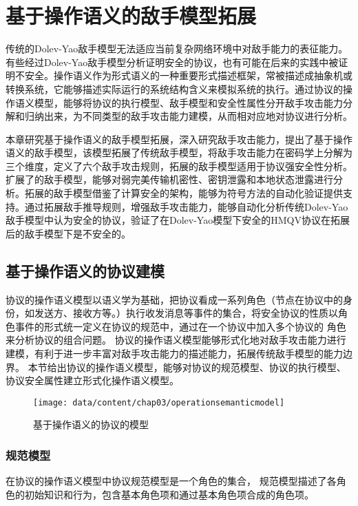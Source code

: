 ﻿%

\chapter{基于操作语义的敌手模型拓展}
\label{adversary}
传统的Dolev-Yao敌手模型无法适应当前复杂网络环境中对敌手能力的表征能力。有些经过Dolev-Yao敌手模型分析证明安全的协议，也有可能在后来的实践中被证明不安全。操作语义作为形式语义的一种重要形式描述框架，常被描述成抽象机或转换系统，它能够描述实际运行的系统结构含义来模拟系统的执行。通过协议的操作语义模型，能够将协议的执行模型、敌手模型和安全性属性分开敌手攻击能力分解和归纳出来，为不同类型的敌手攻击能力建模，从而相对应地对协议进行分析。

本章研究基于操作语义的敌手模型拓展，深入研究敌手攻击能力，提出了基于操作语义的敌手模型，该模型拓展了传统敌手模型，将敌手攻击能力在密码学上分解为三个维度，定义了六个敌手攻击规则，拓展的敌手模型适用于协议强安全性分析。扩展了的敌手模型，能够对弱完美传输机密性、密钥泄露和本地状态泄露进行分析。拓展的敌手模型借鉴了计算安全的架构，能够为符号方法的自动化验证提供支持。通过拓展敌手推导规则，增强敌手攻击能力，能够自动化分析传统Dolev-Yao敌手模型中认为安全的协议，验证了在Dolev-Yao模型下安全的HMQV协议在拓展后的敌手模型下是不安全的。

\section{基于操作语义的协议建模}

协议的操作语义模型以语义学为基础，把协议看成一系列角色（节点在协议中的身份，如发送方、接收方等。）执行收发消息等事件的集合，将安全协议的性质以角色事件的形式统一定义在协议的规范中，通过在一个协议中加入多个协议的
角色来分析协议的组合问题。
协议的操作语义模型能够形式化地对敌手攻击能力进行建模，有利于进一步丰富对敌手攻击能力的描述能力，拓展传统敌手模型的能力边界。
本节给出协议的操作语义模型，能够对协议的规范模型、协议的执行模型、协议安全属性建立形式化操作语义模型。

\begin{figure}[htp]
	\centering
	\texttt{[image: data/content/chap03/operationsemanticmodel]}
	\caption{基于操作语义的协议的模型}
	\label{fig-opsemanticmodel}
\end{figure}

\subsection{规范模型}
在协议的操作语义模型中协议规范模型是一个角色的集合，
规范模型描述了各角色的初始知识和行为，包含基本角色项和通过基本角色项合成的角色项。

